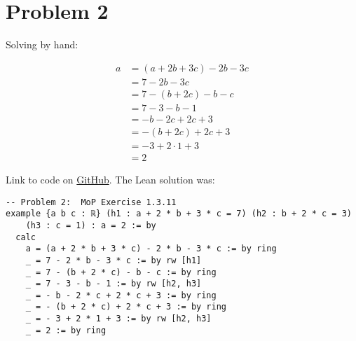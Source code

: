 \documentclass[11pt]{article}
\begin{document}
\section*{Problem 2}
Solving by hand:

\begin{align*}
    a &= (a + 2b + 3c) -2b -3c \\
      &= 7 - 2b - 3c \\
      &= 7 - (b + 2c) - b - c \\
      &= 7 - 3 - b - 1 \\
      &= -b - 2c + 2c + 3 \\
      &= -(b + 2c) + 2c + 3 \\
      &= -3 + 2 \cdot 1 + 3 \\
      &= 2
\end{align*}

Link to code on \href{https://github.com/lucastassis/BU-CS511/blob/main/HW01/code/HW01.lean}{GitHub}. The Lean solution was: 
\begin{lstlisting}
-- Problem 2:  MoP Exercise 1.3.11
example {a b c : ℝ} (h1 : a + 2 * b + 3 * c = 7) (h2 : b + 2 * c = 3)
    (h3 : c = 1) : a = 2 := by
  calc
    a = (a + 2 * b + 3 * c) - 2 * b - 3 * c := by ring
    _ = 7 - 2 * b - 3 * c := by rw [h1]
    _ = 7 - (b + 2 * c) - b - c := by ring
    _ = 7 - 3 - b - 1 := by rw [h2, h3]
    _ = - b - 2 * c + 2 * c + 3 := by ring
    _ = - (b + 2 * c) + 2 * c + 3 := by ring
    _ = - 3 + 2 * 1 + 3 := by rw [h2, h3]
    _ = 2 := by ring

\end{lstlisting}
\end{document}
